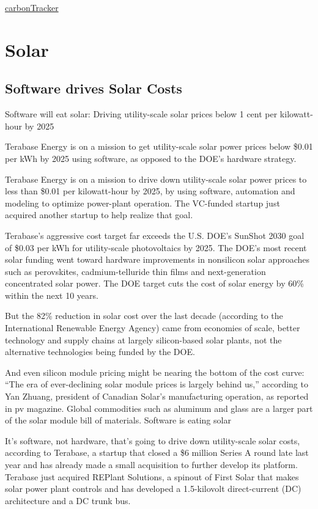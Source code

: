 \documentclass[
]{book}
\begin{document}
\href{https://carbontracker.org/reports/the-skys-the-limit-solar-wind/}{carbonTracker}

\hypertarget{solar}{%
\chapter{Solar}\label{solar}}

\hypertarget{software-drives-solar-costs}{%
\section{Software drives Solar Costs}\label{software-drives-solar-costs}}

Software will eat solar: Driving utility-scale solar prices below 1 cent per kilowatt-hour by 2025

Terabase Energy is on a mission to get utility-scale solar power prices below \$0.01 per kWh by 2025 using software, as opposed to the DOE's hardware strategy.

Terabase Energy is on a mission to drive down utility-scale solar power prices to less than \$0.01 per kilowatt-hour by 2025, by using software, automation and modeling to optimize power-plant operation. The VC-funded startup just acquired another startup to help realize that goal.

Terabase's aggressive cost target far exceeds the U.S. DOE's SunShot 2030 goal of \$0.03 per kWh for utility-scale photovoltaics by 2025. The DOE's most recent solar funding went toward hardware improvements in nonsilicon solar approaches such as perovskites, cadmium-telluride thin films and next-generation concentrated solar power. The DOE target cuts the cost of solar energy by 60\% within the next 10 years.

But the 82\% reduction in solar cost over the last decade (according to the International Renewable Energy Agency) came from economies of scale, better technology and supply chains at largely silicon-based solar plants, not the alternative technologies being funded by the DOE.

And even silicon module pricing might be nearing the bottom of the cost curve: ``The era of ever-declining solar module prices is largely behind us,'' according to Yan Zhuang, president of Canadian Solar's manufacturing operation, as reported in pv magazine. Global commodities such as aluminum and glass are a larger part of the solar module bill of materials.
Software is eating solar

It's software, not hardware, that's going to drive down utility-scale solar costs, according to Terabase, a startup that closed a \$6 million Series A round late last year and has already made a small acquisition to further develop its platform. Terabase just acquired REPlant Solutions, a spinout of First Solar that makes solar power plant controls and has developed a 1.5-kilovolt direct-current (DC) architecture and a DC trunk bus.
\end{document}
